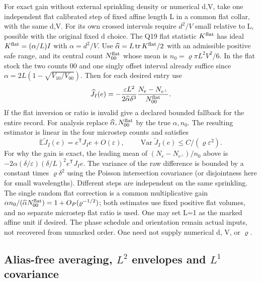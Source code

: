 \documentclass[11pt]{article}
\providecommand{\texorpdfstring}[2]{#1}
\begin{document}
For exact gain without external sprinkling density or numerical d,V, take one independent flat calibrated step of fixed affine length L in a common flat collar, with the same d,V. For its own crossed intervals require \(d^2/V\) small relative to L, possible with the original fixed d choice. The Q19 flat statistic \(K^{\rm flat}\) has ideal \(K^{\rm flat}=(\alpha/L)I\) with \(\alpha=d^2/V\). Use \(\widehat\alpha=L\operatorname{tr}K^{\rm flat}/2\) with an admissible positive safe range, and its central count \(N^{\rm flat}_{00}\) whose mean is \(n_0=\varrho\pi L^2V^2/6\). In the flat stock the two counts 00 and one singly offset interval already suffice since \(\alpha=2L(1-\sqrt{V_{10}/V_{00}})\). Then for each desired entry use
\[
 \widehat J_I(e)=-\frac{\varepsilon L^2}{2\widehat\alpha\delta^3}
          \frac{N_e-N_{e^\perp}}{N^{\rm flat}_{00}} .
\]
If the flat inversion or ratio is invalid give a declared bounded fallback for the entire record. For analysis replace \(\widehat\alpha,N^{\rm flat}_{00}\) by the true \(\alpha,n_0\). The resulting estimator is linear in the four microstep counts and satisfies
\[
 \mathbb E \widetilde J_I(e)=e^{\mathsf T}J_I e+O(\varepsilon),
 \qquad \operatorname{Var}\widetilde J_I(e)\le C/(\varrho\varepsilon^2).
\]
For why the gain is exact, the leading mean of \((N_e-N_{e^\perp})/n_0\) above is
\(-2\alpha (\delta/\varepsilon)(\delta/L)^2e^{\mathsf T}J_I e\).
The variance of the raw difference is bounded by a constant times \(\varrho\delta^2\) using the Poisson intersection covariance (or disjointness here for small wavelengths). Different steps are independent on the same sprinkling. The single random flat correction is a common multiplicative gain
\(\alpha n_0/(\widehat\alpha N^{\rm flat}_{00})=1+O_P(\varrho^{-1/2})\);
both estimates use fixed positive flat volumes, and no separate microstep flat ratio is used. One may set L=1 as the marked affine unit if desired. The phase schedule and orientation remain actual inputs, not recovered from unmarked order. One need not supply numerical d, V, or \(\varrho\).

\subsection{\texorpdfstring{Alias-free averaging, \(L^2\) envelopes and \(L^1\) covariance}{Alias-free averaging, L\^{}2 envelopes and L\^{}1 covariance}}\label{alias-free-averaging-l2-envelopes-and-l1-covariance}
\end{document}
